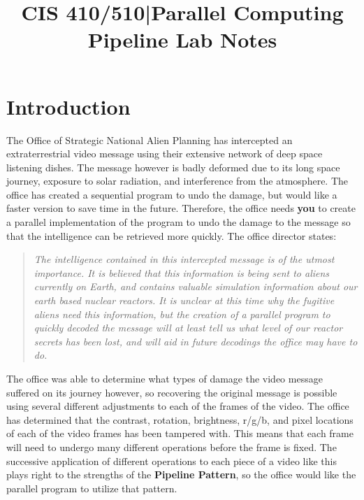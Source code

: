\documentclass[]{scrartcl}
\title{CIS 410/510|Parallel Computing \\ Pipeline Lab Notes}
\date{}
\begin{document}
	\maketitle

	\section{Introduction}
		The Office of Strategic National Alien Planning has intercepted an extraterrestrial video message using their extensive network of deep space listening dishes. The message however is badly deformed due to its long space journey, exposure to solar radiation, and interference from the atmosphere. The office has created a sequential program to undo the damage, but would like a faster version to save time in the future. Therefore, the office needs \textbf{you} to create a parallel implementation of the program to undo the damage to the message so that the intelligence can be retrieved more quickly. The office director states:
		
		\begin{quote}
			\textit{The intelligence contained in this intercepted message is of the utmost importance. It is believed that this information is being sent to aliens currently on Earth, and contains valuable simulation information about our earth based nuclear reactors. It is unclear at this time why the fugitive aliens need this information, but the creation of a parallel program to quickly decoded the message will at least tell us what level of our reactor secrets has been lost, and will aid in future decodings the office may have to do.}
		\end{quote}
		
		The office was able to determine what types of damage the video message suffered on its journey however, so recovering the original message is possible using several different adjustments to each of the frames of the video. The office has determined that the contrast, rotation, brightness, r/g/b, and pixel locations of each of the video frames has been tampered with. This means that each frame will need to undergo many different operations before the frame is fixed. The successive application of different operations to each piece of a video like this plays right to the strengths of the \textbf{Pipeline Pattern}, so the office would like the parallel program to utilize that pattern. 
		
	
	


	
\end{document}
